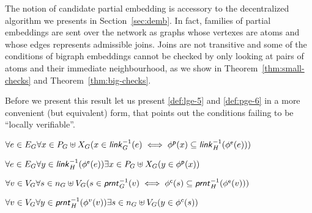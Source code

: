\documentclass[a4paper,english,10pt]{article}
\theoremstyle{plain}\newtheorem{theorem}{Theorem}
\theoremstyle{plain}\newtheorem{corollary}[theorem]{Corollary}
\theoremstyle{plain}\newtheorem{proposition}[theorem]{Proposition}
\theoremstyle{plain}\newtheorem{lemma}[theorem]{Lemma}
\theoremstyle{plain}\newtheorem{definition}{Definition}
\theoremstyle{plain}\newtheorem{remark}{Remark}
\theoremstyle{plain}\newtheorem{example}[remark]{Example}
\newcommand{\?}[1]{}
\newcommand{\prnt}{\textsf{\textit{prnt}}}
\newcommand{\link}{\textsf{\textit{link}}}
\newcommand{\esf}[2]{#1^\mathsf{#2}}
\newcommand{\ephi}[1]{\esf{\phi}{#1}}
\begin{document}
The notion of candidate partial embedding is accessory to the
decentralized algorithm we presents in Section~\ref{sec:demb}.  In
fact, families of partial embeddings are sent over the network as
graphs whose vertexes are atoms and whose edges represents admissible
joins. Joins are not transitive and some of the conditions of bigraph
embeddings cannot be checked by only looking at pairs of atoms and
their immediate neighbourhood, as we show in
Theorem~\ref{thm:small-checks} and Theorem~\ref{thm:big-checks}.

Before we present this result let us present \ref{def:lge-5} and
\ref{def:pge-6} in a more convenient (but equivalent) form,
that points out the conditions failing to be ``locally verifiable''.
\begin{description}\itemsep=0pt
	\item[(LGE-5a)\label{def:lge-5a}] 
		$\forall e \in E_G \forall x \in P_G \uplus X_G ( x \in \link^{-1}_G(e) \iff \ephi p(x)\subseteq \link^{-1}_H(\ephi e(e)))$
	\item[(LGE-5b)\label{def:lge-5b}] 
		$\forall e \in E_G \forall y \in \link^{-1}_H(\ephi e(e)) \exists x \in P_G \uplus X_G ( y \in \ephi p(x) )$
	\item[(PGE-6a)\label{def:pge-6a}] 
			$\forall v \in V_G \forall s \in n_G \uplus V_G ( s \in \prnt^{-1}_G(v) \iff \ephi c(s)\subseteq \prnt^{-1}_H(\ephi e(v)))$
	\item[(PGE-6b)\label{def:pge-6b}] 
			$\forall v \in V_G \forall y \in \prnt^{-1}_H(\phi^v(v)) \exists s \in n_G \uplus V_G ( y \in \phi^c(s) )$
\end{description}
\end{document}
